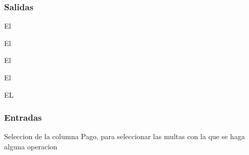 \subsubsection{Salidas}
	\begin{Citemize}
		\item El 
		\item El 
		\item El 
		\item El 
		\item EL 
	\end{Citemize}
	
\subsubsection{Entradas}
	\begin{Citemize}
		\item Seleccion de la columna Pago, para seleccionar las multas con la que se haga alguna operacion
	\end{Citemize}